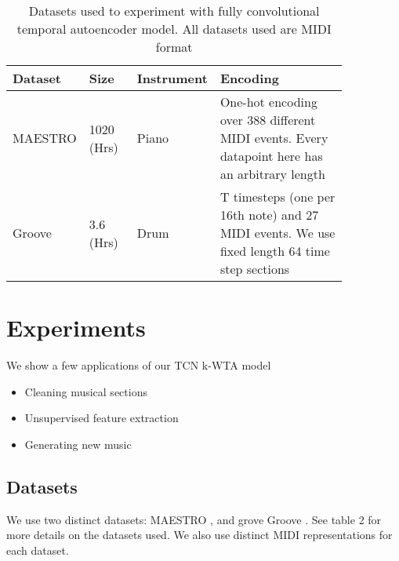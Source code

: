 \documentclass[11pt,a4paper]{article}
\begin{document}
\begin{table*}[ht]
    \centering
    \begin{tabular}{p{0.15\linewidth} | p{0.15\linewidth} | p{0.1\linewidth}  | p{0.45\linewidth} }
      Dataset  & Size  & Instrument &  Encoding\\ \hline
      MAESTRO \citep{Gusfield:97}  & 1020 (Hrs)   & Piano &  One-hot encoding over 388 different MIDI events. Every datapoint here has an arbitrary length \\
        \hline
        Groove \citet{Gusfield:97} & 3.6 (Hrs)  & Drum &  T timesteps (one per 16th note) and 27 MIDI events. We use fixed length 64 time step sections\\
    \end{tabular}
    \caption{Datasets used to experiment with fully convolutional temporal autoencoder model. All datasets used are MIDI format }
    \label{tab:my_label}
\end{table*}




\section{Experiments}
\label{ssec:experiments}

We show a few applications of our TCN k-WTA model

\begin{itemize}
\item Cleaning musical sections
\item Unsupervised feature extraction 
\item Generating new music
\end{itemize}


\subsection{Datasets}
\label{ssec:experiments}

We use two distinct datasets: MAESTRO  \citep{Gusfield:97}, and  grove Groove  \citep{Gusfield:97} . See table 2 for more details on the datasets used. We also use distinct MIDI representations for each dataset. 
\end{document}
